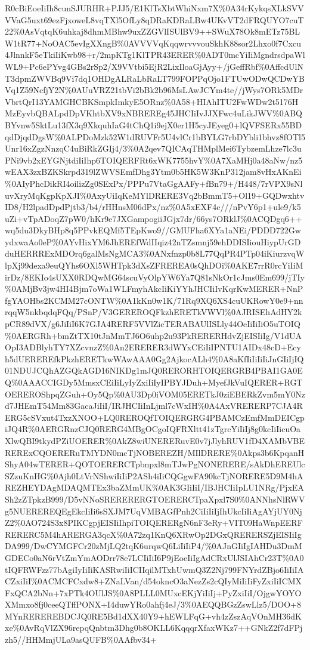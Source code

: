 \documentclass[]{article}
\begin{document}
R0cBiEoeIiIh8cunSJURHR+PJJ5/E1KlTsXbtWhiNxm7X\%0A34rKykqsXLkSVVVVaG5uxt69ezFjxoweL8vqTXl5OfLy8qDRaKDRaLBw4UKvVT2dFRQUYO7cuT22\%0AsVqtqK6uhkaj8dhmMBhw9uxZZGVlISUlBV9++SWuX78Ok8mETz75BLW1tR77+NoOAC5evIgXXngB\%0AVVVVqKqqwrvvvouSkhK88sor2Lhxo0f7Cxcu4JlnnkF5eTkiIiKwb98+r/2mpKTg1KlTPR43ERER\%0ADT0mcYiIiMgndrsdpaWlWL9+Pc6ePYvg4GBs2rSp2/X9VVtbi5EjR2LixIloaGjAyy+/jGeffRbf\%0AffcdUlNT3dpmZWVBq9Vi7dq1OHDgALRaLbRaLT799FOPPqOjo1FTUwODwQCDwYBVq1Z59NcfjY2N\%0AUuVRZ21tbVi2bBk2b96MsLAwJCYm4te//jWys7ORk5MDrVbrtQrI13YAMGHCBKSmpkImkyE5ORnz\%0A58+HIAhITU2FwWDw2t5176HMzEyvbQBALpdDpVKhtbXV9xNBREREg45JHCIiIvJJXFwc4uLikJWV\%0ABQBYvnw5SktLu13fX3q9XkquhIaG4tChQ1i9ejX0er1H5cyJEyeg0+lQVFSERx55BDqdDjqdDgsW\%0ALPDoMzk52W1dRUVFr5U4vlCr1bBYLG7rbDYbli1bhvz8fOTl5Unr16xZgzNnzqC4uBiRkZGIj4/3\%0A2qev7QICAqTHMplMei6TybzemLhze7lc3uPNi9vb2xEYGNjtdiIiIhp6TOIQERFRt6xWK7755hvY\%0A7XaMHj0a48aNw/nz5wEAX3zxBZKSkrpd319lZWVSEmfDhg3Ytm0b5HK5W3KnP312jam8vHxAKnEi\%0AIyPhcDikRI4oilizZg0SExPx/PPPu7VtaGgAAFy+fBn79+/H448/7rVPX9sNluvXryMqKgpKpXJI\%0AxyUiIqKeMYlDRERE3Vq2bBmmT5+Ol19+GQDwxhtvID8/H2lpadDpdPjtb3/b4/rHHnsM06dPx/nz\%0A5xEXF4c///nPvY6p1+ule9/k5uZi+vTpADoqZ7pW0/hKr9e7JXGampogiiJGjx7dr/66ys7ORklJ\%0ACQDgq6++wq5du3DkyBHp8q5PPvkEQMf5TEpKwo9//GMUFha6XYa1aNEi/PDDD722GwydxwaAo0eP\%0AYvHixYM6JhEREfWdIIqiz42nTZsmnj59ehDDISIiouHiypUrGDduHERRRExMDOrq6galMsNgMCA3\%0ANxfnzp0b8L77QqPR4PTp04iKiurzvqWlpXj99dexa9euQYhs6OXl5WHTpk3dXsZFREREA0sQhDOi\%0AKE7rrR0rcYiIiMirDz/8EKIo4sUXX0RDQwMG64scuVyOlpYW6Ya7Q81sNkOr1cJms0Em699/jTIy\%0AMjBv3jw4HI4Bjm7oWa1WLFmyhAkcIiKiYYhJHCIiIvKqrKwMERER+NnPfgYAOHbs2KCMM27cONTW\%0A1kKn0w1K/71Rq9XQ6XS4cuUKRowY0e9+nnrqqW5nkbqdqFQq/PSnP/V3GEREROQFkzhERETkVWVl\%0AJRISEhAdHY2kpCR89dVX/g6JiIiI6K7GJA4RERF5VVlZicTERABAUlISLly44OeIiIiIiO5uTOIQ\%0AERGRh+bmZtTX10tJnMmTJ6O6uhp2u93PkRERERHdvZjEISIiIg/V1dUAOpI3ADBlyhTY7XZcvnzZ\%0An2ERERER3dWYxCEiIiIPNTU1AIDx48cD+Ecyh5dUEREREfkPkzhERETkwWAwAAA0Gg2AjkocALh4\%0A8aKfIiIiIiIiJnGIiIjIQ01NDUJCQhAZGQkAGD16NIKDg1mJQ0RERORHTOIQERGRB4PBAI1GA0EQ\%0AAACCIGDy5MmsxCEiIiLyIyZxiIiIyIPBYJDuh+MyefJkVuIQERER+RGTOEREROShpqZGuh+Oy5Qp\%0AU3Dp0iVOM05ERETkJ0ziEBERkZvm5mY0Nzd7JHEmT54Mm83GacaJiIiI/IRJHCIiInLjml7cWxIH\%0A4AxVRERERP7CJA4RERG5cSVxut4TxzXNOO+LQ0REROQfTOIQERGRG4PBAMCzEmfMmDEICgpiJQ4R\%0AERGRnzCJQ0RERG4MBgOCgoIQFRXltt41zTgrcYiIiIj8g0kcIiIicuOaXlwQBI9tkydPZiUOERER\%0AkZ8wiUNERERuvE0v7jJlyhRUV1fD4XAMbVBERERExCQOERERuTMYDN0mcTjNOBEREZH/MIlDRERE\%0Akps3b6KpqanHShyA04wTERER+QOTOERERCTpbnpxl8mTJwPgNONERERE/sAkDhEREUlcSZzuKnHG\%0Ajh0LtVrNShwiIiIiP2ASh4iIiCQGgwFA90kcTjNORERE5D9M4hAREZHEYDAgMDAQMTEx3baZMmUK\%0AK3GIiIiI/IBJHCIiIpLU1NRg/PjxEASh2zZTpkzB999/D5vNNoSRERERERGTOERERCTpaXpxl7S0\%0ANNhsNlRWVg5NUEREREQEgEkcIiIi6sSXJM7UqVMBAGfPnh2CiIiIiIjIhUkcIiIiAgAYjUY0NjZ2\%0AO724S3x8PIKCgpjEISIiIhpiTOIQERERgN6nF3eRy+VIT09HaWnpEERFRERERC5M4hARERGA3qcX\%0A72zq1KnQ6XRwOp2DGxQRERERSZjEISIiIgDA999/DwCYMGFCr20zMjLQ2tqK6urqwQ6LiIiIiP4/\%0AJnGIiIgIAHDu3DmMGDECo0aN6rVtZmYmAODrr78e7LCIiIiI6P9jEoeIiIgAdCRxUlJSIAhCr23T\%0A0tIQFRWFzz77bAgiIyIiIiKASRwiIiICIIqilMTxhUwmQ3Z2Nj799FNYrdZBjo6IiIiIACZxiIiI\%0ACMCFCxdw8+ZNaLVan/d54okncO3aNezZs2cQIyMiIiIiFyZxiIiICMXFxQCA2bNn+7xPTk4OUlJS\%0A8PLLL0MUxcEKjYiIiIj+PyZxiIiI/OjgwYOYOXMmxo8fj0ceeQTffPONX+I4duwYRo0ahfj4eJ/3\%0AEQQBGzZswLlz5/DOO+8MYnREREREBDCJQ0RE5Bd1dXX40Y9+hEWLFqG+vh4zZszAqVOnMH36dKxe\%0AvRqVlZX96repqQnbtm3Dhg0b8OKLL6KqqqrXfaxWKz7++GNkZ2f7dFPjzh5//HHMmjULa9asQUFB\%0AAfbv34+
\end{document}
